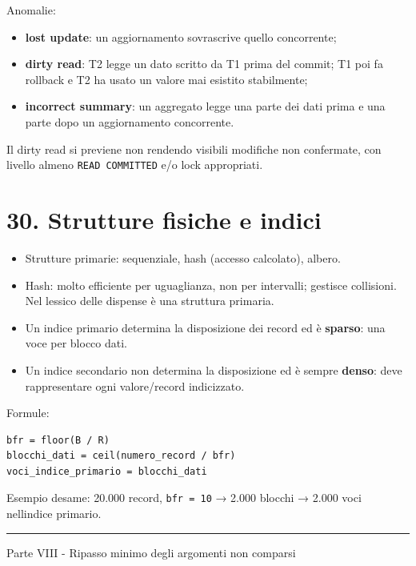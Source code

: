 \documentclass[
  10pt,
  a4paper,
]{article}
\providecommand{\tightlist}{%
  \setlength{\itemsep}{0pt}\setlength{\parskip}{0pt}}
\begin{document}
Anomalie:

\begin{itemize}
\tightlist
\item
  \textbf{lost update}: un aggiornamento sovrascrive quello concorrente;
\item
  \textbf{dirty read}: T2 legge un dato scritto da T1 prima del commit;
  T1 poi fa rollback e T2 ha usato un valore mai esistito stabilmente;
\item
  \textbf{incorrect summary}: un aggregato legge una parte dei dati
  prima e una parte dopo un aggiornamento concorrente.
\end{itemize}

Il dirty read si previene non rendendo visibili modifiche non
confermate, con livello almeno \texttt{READ\ COMMITTED} e/o lock
appropriati.

\section{30. Strutture fisiche e
indici}\label{30-strutture-fisiche-e-indici}

\begin{itemize}
\tightlist
\item
  Strutture primarie: sequenziale, hash (accesso calcolato), albero.
\item
  Hash: molto efficiente per uguaglianza, non per intervalli; gestisce
  collisioni. Nel lessico delle dispense è una struttura primaria.
\item
  Un indice primario determina la disposizione dei record ed è
  \textbf{sparso}: una voce per blocco dati.
\item
  Un indice secondario non determina la disposizione ed è sempre
  \textbf{denso}: deve rappresentare ogni valore/record indicizzato.
\end{itemize}

Formule:

\begin{verbatim}
bfr = floor(B / R)
blocchi_dati = ceil(numero_record / bfr)
voci_indice_primario = blocchi_dati
\end{verbatim}

Esempio d\textquotesingle esame: 20.000 record, \texttt{bfr\ =\ 10} →
2.000 blocchi → 2.000 voci nell\textquotesingle indice primario.

\begin{center}\rule{0.5\linewidth}{0.5pt}\end{center}

Parte VIII - Ripasso minimo degli argomenti non comparsi
\end{document}
